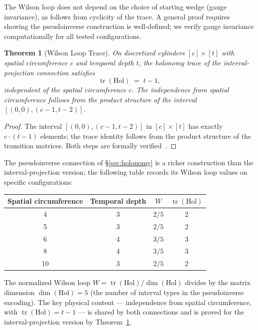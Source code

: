 \documentclass[11pt,a4paper]{article}
\theoremstyle{plain}
\newtheorem{theorem}{Theorem}[section]
\theoremstyle{definition}
\theoremstyle{remark}
\newcommand{\Hol}{\mathrm{Hol}}
\begin{document}
The Wilson loop does not depend on the choice of starting wedge (gauge invariance), as follows from cyclicity of the trace.
A general proof requires showing the pseudoinverse construction is well-defined; we verify gauge invariance computationally for all tested configurations.

\begin{theorem}[Wilson Loop Trace]\label{thm:wilson}
On discretized cylinders $[c] \times [t]$ with spatial circumference $c$ and temporal depth $t$, the holonomy trace of the interval-projection connection satisfies
\[
\operatorname{tr}(\Hol) \;=\; t - 1,
\]
independent of the spatial circumference $c$.
The independence from spatial circumference follows from the product structure of the interval $[(0,0), (c{-}1, t{-}2)]$.
\end{theorem}

\begin{proof}
The interval $[(0,0), (c{-}1, t{-}2)]$ in $[c] \times [t]$ has exactly $c \cdot (t{-}1)$ elements; the trace identity follows from the product structure of the transition matrices.
Both steps are formally verified~\cite{leanrepo}.
\end{proof}

The pseudoinverse connection of \S\ref{sec:holonomy} is a richer construction than the interval-projection version; the following table records its Wilson loop values on specific configurations:

\medskip
\begin{center}
\begin{tabular}{cccc}
\toprule
Spatial circumference & Temporal depth & $W$ & $\operatorname{tr}(\Hol)$ \\
\midrule
4 & 3 & $2/5$ & 2 \\
5 & 3 & $2/5$ & 2 \\
6 & 4 & $3/5$ & 3 \\
8 & 4 & $3/5$ & 3 \\
10 & 3 & $2/5$ & 2 \\
\bottomrule
\end{tabular}
\end{center}
\medskip

\noindent The normalized Wilson loop $W = \operatorname{tr}(\Hol)/\dim(\Hol)$ divides by the matrix dimension $\dim(\Hol) = 5$ (the number of interval types in the pseudoinverse encoding).
The key physical content --- independence from spatial circumference, with $\operatorname{tr}(\Hol) = t - 1$ --- is shared by both connections and is proved for the interval-projection version by Theorem~\ref{thm:wilson}.
\end{document}
